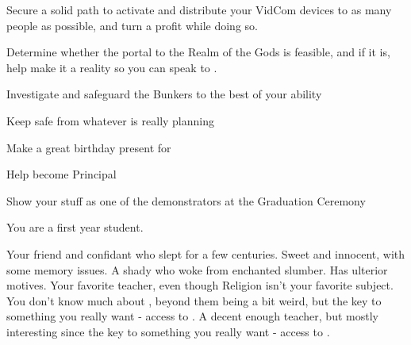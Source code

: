 \documentclass[char]{GL2020}
\begin{document}
\begin{itemz}[Goals]
	\item Secure a solid path to activate and distribute your VidCom devices to as many people as possible, and turn a profit while doing so.
	\item Determine whether the portal to the Realm of the Gods is feasible, and if it is, help make it a reality so you can speak to \cTechGod{}.
	\item Investigate and safeguard the Bunkers to the best of your ability
	\item Keep \cDisney{} safe from whatever \cWildCard{} is really planning
	\item Make a great birthday present for \cDisney{}
	\item Help \cBeetle{} become Principal
	\item Show your stuff as one of the demonstrators at the Graduation Ceremony
\end{itemz}

\begin{itemz}[Notes]
	\item You are a first year student.
\end{itemz}

\begin{contacts}
	\contact{\cDisney{}} Your friend and confidant who slept for a few centuries. Sweet and innocent, with some memory issues.
	\contact{\cWildCard{}} A shady \cWildCard{\person} who woke \cDisney{} from \cDisney{\their} enchanted slumber. Has ulterior motives.
	\contact{\cBeetle{}} Your favorite teacher, even though Religion isn’t your favorite subject. 
	\contact{\cCurse{}} You don’t know much about \cCurse{\them}, beyond them being a bit weird, but \cCurse{\they} \cCurse{\have} the key to something you really 	want - access to \cTechGod{}.  
	\contact{\cFlowPriest{}} A decent enough teacher, but mostly interesting since \cFlowPriest{\they} \cFlowPriest{\have} the key to something you really want - access to \cTechGod{}. 
\end{contacts}
\end{document}
